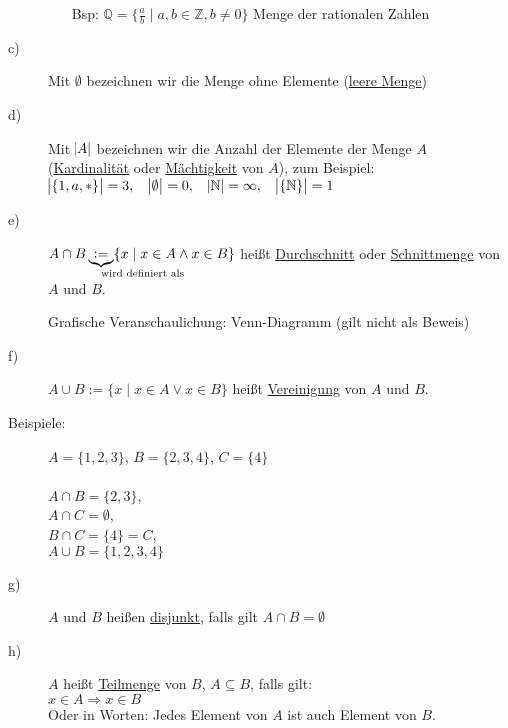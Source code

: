 \documentclass[a4paper, 12pt, twoside] {article}
\newcommand{\attention}{{\fontencoding{U}\fontfamily{futs}\selectfont\char 66\relax}\space}
\begin{document}
\begin{description}
\begin{itemize}
		Bsp: $\mathbb{Q} = \{\frac{a}{b} \mid a,b \in \mathbb{Z}, b \neq 0 \}$ Menge der rationalen Zahlen		
	\end{itemize}
\item[c)]
	Mit $\emptyset$ bezeichnen wir die Menge ohne Elemente (\underline{leere Menge})
\item[d)]
	Mit $\abs{A}$ bezeichnen wir die Anzahl der Elemente der Menge $A$ (\underline{Kardinalität} oder \underline{Mächtigkeit} von $A$), zum Beispiel: \\
	$\abs{\{1,a,*\}} = 3, \quad \abs{\emptyset} = 0, \quad \abs{\mathbb{N}} = \infty, \quad \abs{\{\mathbb{N}\}} = 1$
\item[e)]
	$A \cap B \underbrace{:=}_{\mathrlap{\text{wird definiert als}}} \{x \mid x \in A \wedge x \in B\}$ heißt \underline{Durchschnitt} oder \underline{Schnittmenge} von $A$ und $B$.
	
	Grafische Veranschaulichung: Venn-Diagramm (\attention gilt nicht als Beweis)
	
	\begin{venndiagram2sets}
	\fillACapB
	\end{venndiagram2sets}

	
\item[f)]
	$A \cup B :=\{x \mid x \in A \lor x \in B \}$ heißt \underline{Vereinigung} von $A$ und $B$.
		
	\begin{venndiagram2sets}
	\fillA \fillB
	\end{venndiagram2sets}
	
\item[Beispiele:]
	$A = \{1,2,3\}$, $B = \{2,3,4\}$, $C = \{4\}$\\ \\
		$A \cap B = \{2,3\}$,\\
		$A \cap C = \emptyset$,\\
		$B \cap C = \{4\} = C$,\\
		$A \cup B = \{1,2,3,4\}$
		
\item[g)]
	$A$ und $B$ heißen \underline{disjunkt}, falls gilt $A \cap B = \emptyset$
		
	\begin{venndiagram2sets}[overlap=-20]		
	\end{venndiagram2sets}
	
\item[h)]
	$A$ heißt \underline{Teilmenge} von $B$, $A \subseteq B$, falls gilt: \\
	$x \in A \Rightarrow x \in B$\\
	Oder in Worten: Jedes Element von $A$ ist auch Element von $B$.
	

\end{description}
\end{document}
